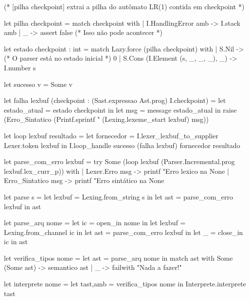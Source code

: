 \documentclass[12pt,a4paper,twoside]{report}
\begin{document}
\begin{terminal}
(* [pilha checkpoint] extrai a pilha do autômato LR(1) contida em checkpoint *)

let pilha checkpoint =
  match checkpoint with
  | I.HandlingError amb -> I.stack amb
  | _ -> assert false (* Isso não pode acontecer *)

let estado checkpoint : int =
  match Lazy.force (pilha checkpoint) with
  | S.Nil -> (* O parser está no estado inicial *)
     0
  | S.Cons (I.Element (s, _, _, _), _) ->
     I.number s

let sucesso v = Some v

let falha lexbuf (checkpoint : (Sast.expressao Ast.prog) I.checkpoint) =
  let estado_atual = estado checkpoint in
  let msg = message estado_atual in
  raise (Erro_Sintatico (Printf.sprintf "%
                                      (Lexing.lexeme_start lexbuf) msg))

let loop lexbuf resultado =
  let fornecedor = I.lexer_lexbuf_to_supplier Lexer.token lexbuf in
  I.loop_handle sucesso (falha lexbuf) fornecedor resultado


let parse_com_erro lexbuf =
  try
    Some (loop lexbuf (Parser.Incremental.prog lexbuf.lex_curr_p))
  with
  | Lexer.Erro msg ->
     printf "Erro lexico na %
     None
  | Erro_Sintatico msg ->
     printf "Erro sintático na %
     None

let parse s =
  let lexbuf = Lexing.from_string s in
  let ast = parse_com_erro lexbuf in
  ast

let parse_arq nome =
  let ic = open_in nome in
  let lexbuf = Lexing.from_channel ic in
  let ast = parse_com_erro lexbuf in
  let _ = close_in ic in
  ast

let verifica_tipos nome =
  let ast = parse_arq nome in
  match ast with
    Some (Some ast) -> semantico ast
  | _ -> failwith "Nada a fazer!\n"

let interprete nome =
  let tast,amb = verifica_tipos nome in
  Interprete.interprete tast

\end{terminal}
\end{document}

